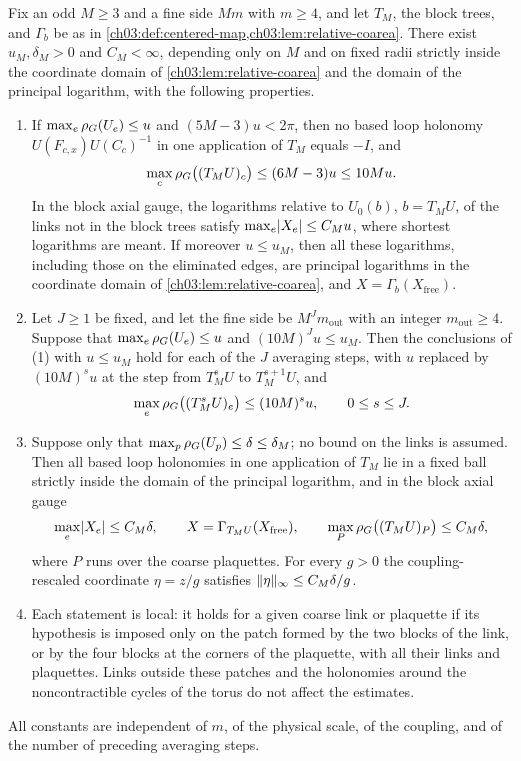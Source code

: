 \begin{lemma}\label{ch04:lem:actual-local-branch}
Fix an odd $M\ge3$ and a fine side $Mm$ with $m\ge4$, and let $T_M$, the block trees, and $\Gamma_b$ be as in \cref{ch03:def:centered-map,ch03:lem:relative-coarea}. There exist $u_M,\delta_M>0$ and $C_M<\infty$, depending only on $M$ and on fixed radii strictly inside the coordinate domain of \cref{ch03:lem:relative-coarea} and the domain of the principal logarithm, with the following properties.
\begin{enumerate}
\item If $\max_e\rho_G(U_e)\le u$ and $(5M-3)u<2\pi$, then no based loop holonomy $U(F_{c,x})U(C_c)^{-1}$ in one application of $T_M$ equals $-I$, and
\[
 \max_c\rho_G\bigl((T_MU)_c\bigr)\le(6M-3)u\le10Mu.
\]
In the block axial gauge, the logarithms relative to $U_0(b)$, $b=T_MU$, of the links not in the block trees satisfy $\max_e\lvert X_e\rvert\le C_Mu$, where shortest logarithms are meant. If moreover $u\le u_M$, then all these logarithms, including those on the eliminated edges, are principal logarithms in the coordinate domain of \cref{ch03:lem:relative-coarea}, and $X=\Gamma_b(X_{\mathrm{free}})$.
\item Let $J\ge1$ be fixed, and let the fine side be $M^Jm_{\mathrm{out}}$ with an integer $m_{\mathrm{out}}\ge4$. Suppose that $\max_e\rho_G(U_e)\le u$ and $(10M)^Ju\le u_M$. Then the conclusions of (1) with $u\le u_M$ hold for each of the $J$ averaging steps, with $u$ replaced by $(10M)^su$ at the step from $T_M^sU$ to $T_M^{s+1}U$, and
\[
 \max_e\rho_G\bigl((T_M^sU)_e\bigr)\le(10M)^su,\qquad0\le s\le J.
\]
\item Suppose only that $\max_p\rho_G(U_p)\le\delta\le\delta_M$; no bound on the links is assumed. Then all based loop holonomies in one application of $T_M$ lie in a fixed ball strictly inside the domain of the principal logarithm, and in the block axial gauge
\[
 \max_e\lvert X_e\rvert\le C_M\delta,\qquad X=\Gamma_{T_MU}(X_{\mathrm{free}}),\qquad \max_P\rho_G\bigl((T_MU)_P\bigr)\le C_M\delta,
\]
where $P$ runs over the coarse plaquettes. For every $g>0$ the coupling-rescaled coordinate $\eta=z/g$ satisfies $\lVert \eta\rVert_\infty\le C_M\delta/g$.
\item Each statement is local: it holds for a given coarse link or plaquette if its hypothesis is imposed only on the patch formed by the two blocks of the link, or by the four blocks at the corners of the plaquette, with all their links and plaquettes. Links outside these patches and the holonomies around the noncontractible cycles of the torus do not affect the estimates.
\end{enumerate}
All constants are independent of $m$, of the physical scale, of the coupling, and of the number of preceding averaging steps.
\end{lemma}


